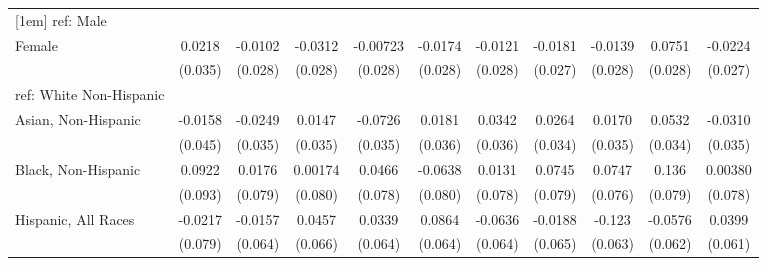 \begin{table}[htbp]
\begin{tabular}{l*{10}{c}}
[1em]
ref: Male&                     &                     &                     &                     &                     &                     &                     &                     &                     &                     \\
[1em]
Female&      0.0218         &     -0.0102         &     -0.0312         &    -0.00723         &     -0.0174         &     -0.0121         &     -0.0181         &     -0.0139         &      0.0751\sym{***}&     -0.0224         \\
  &     (0.035)         &     (0.028)         &     (0.028)         &     (0.028)         &     (0.028)         &     (0.028)         &     (0.027)         &     (0.028)         &     (0.028)         &     (0.027)         \\
[1em]
ref: White Non-Hispanic&                     &                     &                     &                     &                     &                     &                     &                     &                     &                     \\
[1em]
Asian, Non-Hispanic&     -0.0158         &     -0.0249         &      0.0147         &     -0.0726\sym{**} &      0.0181         &      0.0342         &      0.0264         &      0.0170         &      0.0532         &     -0.0310         \\
  &     (0.045)         &     (0.035)         &     (0.035)         &     (0.035)         &     (0.036)         &     (0.036)         &     (0.034)         &     (0.035)         &     (0.034)         &     (0.035)         \\
[1em]
Black, Non-Hispanic&      0.0922         &      0.0176         &     0.00174         &      0.0466         &     -0.0638         &      0.0131         &      0.0745         &      0.0747         &       0.136\sym{*}  &     0.00380         \\
  &     (0.093)         &     (0.079)         &     (0.080)         &     (0.078)         &     (0.080)         &     (0.078)         &     (0.079)         &     (0.076)         &     (0.079)         &     (0.078)         \\
[1em]
Hispanic, All Races&     -0.0217         &     -0.0157         &      0.0457         &      0.0339         &      0.0864         &     -0.0636         &     -0.0188         &      -0.123\sym{**} &     -0.0576         &      0.0399         \\
  &     (0.079)         &     (0.064)         &     (0.066)         &     (0.064)         &     (0.064)         &     (0.064)         &     (0.065)         &     (0.063)         &     (0.062)         &     (0.061)         \\

\end{tabular}
\end{table}
